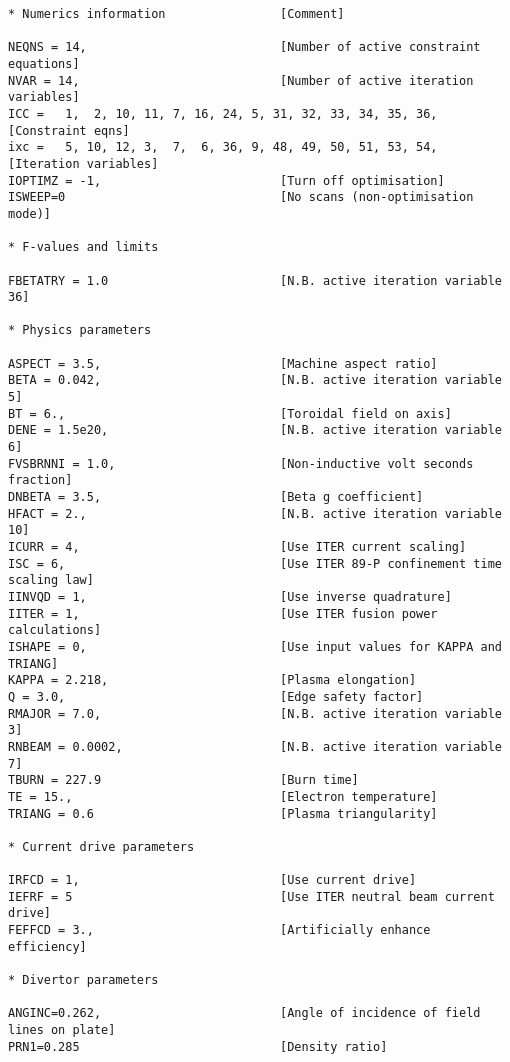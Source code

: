 \documentclass[11pt,a4paper]{report}
\begin{document}
\footnotesize
\begin{verbatim}
* Numerics information                [Comment]

NEQNS = 14,                           [Number of active constraint equations]
NVAR = 14,                            [Number of active iteration variables]
ICC =   1,  2, 10, 11, 7, 16, 24, 5, 31, 32, 33, 34, 35, 36,  [Constraint eqns]
ixc =   5, 10, 12, 3,  7,  6, 36, 9, 48, 49, 50, 51, 53, 54,  [Iteration variables]
IOPTIMZ = -1,                         [Turn off optimisation]
ISWEEP=0                              [No scans (non-optimisation mode)]

* F-values and limits

FBETATRY = 1.0                        [N.B. active iteration variable 36]

* Physics parameters

ASPECT = 3.5,                         [Machine aspect ratio]
BETA = 0.042,                         [N.B. active iteration variable 5]
BT = 6.,                              [Toroidal field on axis]
DENE = 1.5e20,                        [N.B. active iteration variable 6]
FVSBRNNI = 1.0,                       [Non-inductive volt seconds fraction]
DNBETA = 3.5,                         [Beta g coefficient]
HFACT = 2.,                           [N.B. active iteration variable 10]
ICURR = 4,                            [Use ITER current scaling]
ISC = 6,                              [Use ITER 89-P confinement time scaling law]
IINVQD = 1,                           [Use inverse quadrature]
IITER = 1,                            [Use ITER fusion power calculations]
ISHAPE = 0,                           [Use input values for KAPPA and TRIANG]
KAPPA = 2.218,                        [Plasma elongation]
Q = 3.0,                              [Edge safety factor]
RMAJOR = 7.0,                         [N.B. active iteration variable 3]
RNBEAM = 0.0002,                      [N.B. active iteration variable 7]
TBURN = 227.9                         [Burn time]
TE = 15.,                             [Electron temperature]
TRIANG = 0.6                          [Plasma triangularity]

* Current drive parameters

IRFCD = 1,                            [Use current drive]
IEFRF = 5                             [Use ITER neutral beam current drive]
FEFFCD = 3.,                          [Artificially enhance efficiency]

* Divertor parameters

ANGINC=0.262,                         [Angle of incidence of field lines on plate]
PRN1=0.285                            [Density ratio]


\end{verbatim}
\end{document}
